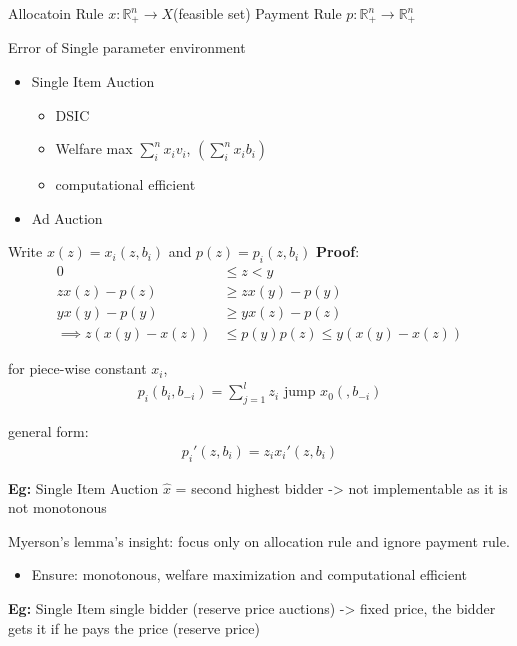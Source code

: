 \documentclass[11pt]{article}
\begin{document}
Allocatoin Rule \(x: \mathbb{R}_+^n \rightarrow X\)(feasible set)
Payment Rule \(p: \mathbb{R}_+^n \rightarrow \mathbb{R}_+^n\)

Error of Single parameter environment
\begin{itemize}
\item Single Item Auction
\begin{itemize}
\item DSIC
\item Welfare max \(\sum_i^n x_iv_i\), \(\left( \sum_i^n x_ib_i \right)\)
\item computational efficient
\end{itemize}
\item Ad Auction
\end{itemize}

Write \(x(z) = x_i(z, b_i)\) and \(p(z) = p_i(z, b_i)\)
\textbf{Proof}:
\begin{align*}
0 &\leq z < y \\
z x(z) - p(z) &\geq z x(y) - p(y) \\
y x(y) - p(y) &\geq y x(z) - p(z) \\
\implies z (x(y) - x(z)) &\leq p(y) p(z) \leq y (x(y) - x(z))
\end{align*}

for piece-wise constant \(x_i\),
\begin{align*}
p_i(b_i, b_{-i}) = \sum_{j=1}^l z_i\text{ jump }x_0(, b_{-i})
\end{align*}

general form:
\begin{align*}
p_i'(z, b_i) = z_i x_i'(z, b_i)
\end{align*}

\begin{center}

\end{center}

\textbf{Eg:} Single Item Auction
\(\hat{x}\) = second highest bidder -> not implementable as it is not monotonous

Myerson's lemma's insight: focus only on allocation rule and ignore payment rule.
\begin{itemize}
\item Ensure: monotonous, welfare maximization and computational efficient
\end{itemize}


\textbf{Eg:} Single Item single bidder (reserve price auctions) -> fixed price, the bidder gets it if he pays the price (reserve price)
\end{document}
